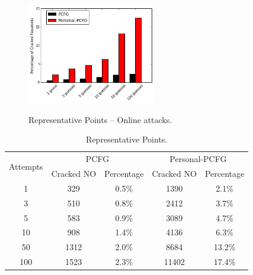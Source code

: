 \begin{figure}[h!]
\centering
  \caption{Representative Points -- Online attacks.}{}
  \label{points}
  \centering
    \includegraphics[width=0.5\textwidth]{fig/online}
\end{figure}

\begin{table}
\centering
\caption{Representative Points.}
\begin{adjustbox}{max width=0.48\textwidth}
\begin{tabular}{|c|c|c|c|c|} \hline
\multirow{2}{*}{Attempts}&\multicolumn{2}{|c|}{PCFG}&\multicolumn{2}{|c|}{Personal-PCFG}\\ \cline{2-5}
&Cracked NO&Percentage&Cracked NO&Percentage\\ \hline
1 & 329 & 0.5\% & 1390 & 2.1\% \\
3 & 510 & 0.8\% & 2412 & 3.7\%\\
5 & 583 & 0.9\% & 3089 & 4.7\%\\
10 & 908 & 1.4\% & 4136 & 6.3\%\\
50 & 1312 & 2.0\% & 8684 & 13.2\%\\
100 & 1523 & 2.3\% & 11402 & 17.4\%\\
\hline\end{tabular}
\end{adjustbox}
\label{cmp100t}
\end{table}


